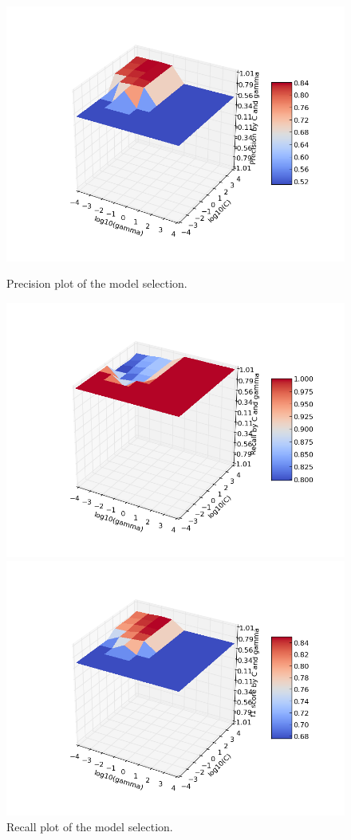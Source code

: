 \documentclass[aps,letterpaper,10pt]{revtex4}
\begin{document}
\begin{figure}[]
  \includegraphics[width=\linewidth]{img/pr_graph.png}
  \caption{Precision plot of the model selection.}\label{fig:7}
\endminipage\hfill
{}
  \includegraphics[width=\linewidth]{img/rec_graph.png}
  \caption{Recall plot of the model selection.}\label{fig:8}
\endminipage\hfill
{}%
  \includegraphics[width=\linewidth]{img/f1_graph.png}

\end{figure}
\end{document}
